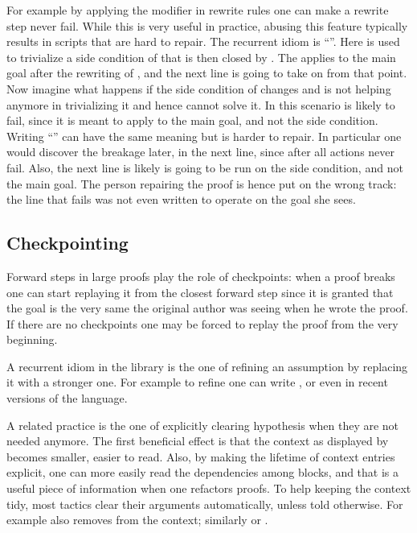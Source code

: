 For example by applying the 
modifier in rewrite rules one can make a rewrite step never fail.
While this is very useful in practice,
abusing this feature typically results in scripts that are hard to
repair. The recurrent idiom is ``''.
Here  is used to trivialize a side condition of  that
is then closed by \C{//}. The  applies to the main goal
after the rewriting of , and the next line is going to take
on from that point.
Now imagine what happens if the side condition of  changes and
 is not helping anymore in trivializing it and hence
\C{//} cannot solve it. In this scenario  is likely to fail,
since it is meant to apply to the main goal, and not the side
condition.\\
Writing ``'' can have the same meaning but
is harder to repair. In particular one would discover the breakage
later, in the next line, since after  all actions never fail.
Also, the next line is likely is going to be run on the side
condition, and not the main goal. The person repairing the proof is
hence put on the wrong track: the line that fails was not even
written to operate on the goal she sees.

\subsection{Checkpointing}

Forward steps in large proofs play the role of checkpoints:
when a proof breaks one can start replaying it from the closest
forward step since it is granted that the goal is the very same
the original author was seeing when he wrote the proof. If there are
no checkpoints one may be forced to replay the proof from the very
beginning.

A recurrent idiom in the \mcbMC{} library is the one of refining an
assumption by replacing it with a stronger one. For example to refine
 one can write , or even  in recent versions of the \mcbSSR{} language.

A related practice is the one of explicitly clearing hypothesis when
they are not needed anymore. The first beneficial effect is that the
context as displayed by \Coq{} becomes smaller, easier to read.  Also,
by making the lifetime of context entries explicit, one can more
easily read the dependencies among blocks, and that is a useful piece
of information when one refactors proofs.  To help keeping the context
tidy, most tactics clear their arguments automatically, unless told
otherwise. For example  also removes  from the
context; similarly  or .

